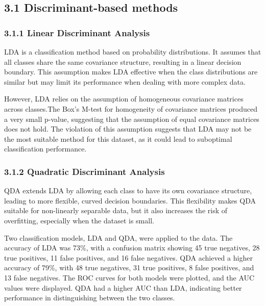 \documentclass[
  12pt,
  letterpaper,
  DIV=11,
  numbers=noendperiod]{scrartcl}
\begin{document}
\subsection{3.1 Discriminant-based
methods}\label{discriminant-based-methods}

\subsubsection{3.1.1 Linear Discriminant
Analysis}\label{linear-discriminant-analysis}

LDA is a classification method based on probability distributions. It
assumes that all classes share the same covariance structure, resulting
in a linear decision boundary. This assumption makes LDA effective when
the class distributions are similar but may limit its performance when
dealing with more complex data.

However, LDA relies on the assumption of homogeneous covariance matrices
across classes.The Box's M-test for homogeneity of covariance matrices
produced a very small p-value, suggesting that the assumption of equal
covariance matrices does not hold. The violation of this assumption
suggests that LDA may not be the most suitable method for this dataset,
as it could lead to suboptimal classification performance.

\subsubsection{3.1.2 Quadratic Discriminant
Analysis}\label{quadratic-discriminant-analysis}

QDA extends LDA by allowing each class to have its own covariance
structure, leading to more flexible, curved decision boundaries. This
flexibility makes QDA suitable for non-linearly separable data, but it
also increases the risk of overfitting, especially when the dataset is
small.

Two classification models, LDA and QDA, were applied to the data. The
accuracy of LDA was 73\%, with a confusion matrix showing 45 true
negatives, 28 true positives, 11 false positives, and 16 false
negatives. QDA achieved a higher accuracy of 79\%, with 48 true
negatives, 31 true positives, 8 false positives, and 13 false negatives.
The ROC curves for both models were plotted, and the AUC values were
displayed. QDA had a higher AUC than LDA, indicating better performance
in distinguishing between the two classes.
\end{document}
